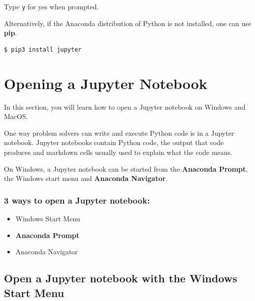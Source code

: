 \documentclass{book}
\begin{document}
Type \lstinline!y! for yes when prompted.

Alternatively, if the Anaconda distribution of Python is not installed,
one can use \textbf{pip}.

\begin{lstlisting}
$ pip3 install jupyter
\end{lstlisting}
    




    
        \section{Opening a Jupyter Notebook}\label{opening-a-jupyter-notebook}
    




    
        In this section, you will learn how to open a Jupyter notebook on
Windows and MacOS.

One way problem solvers can write and execute Python code is in a
Jupyter notebook. Jupyter notebooks contain Python code, the output that
code produces and markdown cells usually used to explain what the code
means.

On Windows, a Jupyter notebook can be started from the \textbf{Anaconda
Prompt}, the Windows start menu and \textbf{Anaconda Navigator}.

\subsubsection{\texorpdfstring{3 ways to open a \textbf{Jupyter
notebook}:}{3 ways to open a Jupyter notebook:}}\label{ways-to-open-a-jupyter-notebook}

\begin{itemize}
\item
  Windows Start Menu
\item
  \textbf{Anaconda Prompt}
\item
  Anaconda Navigator
\end{itemize}
    




    
        \subsection{Open a Jupyter notebook with the Windows Start
Menu}\label{open-a-jupyter-notebook-with-the-windows-start-menu}
    
\end{document}
